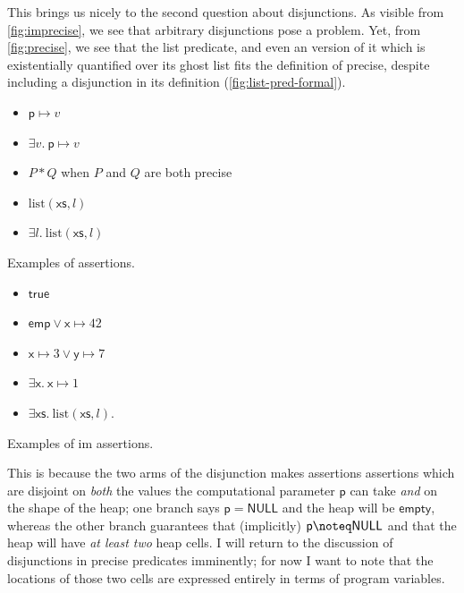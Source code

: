 This brings us nicely to the second question about disjunctions. As visible
from \cref{fig:imprecise}, we see that arbitrary disjunctions pose a problem.
Yet, from \cref{fig:precise}, we see that the list predicate, and even an
version of it which is existentially quantified over its ghost list fits the
definition of precise, despite including a disjunction in its definition
(\cref{fig:list-pred-formal}).

\begin{marginfigure}
\begin{itemize}
    \item $\mathsf{p} \mapsto{} v$
    \item $\exists v.\ \mathsf{p} \mapsto{} v$
    \item $P \ast{} Q$ when $P$ and $Q$ are both precise
    \item $\mathrm{list}(\mathsf{xs}, l)$
    \item $\exists l.\ \mathrm{list}(\mathsf{xs}, l)$
\end{itemize}
\caption{Examples of  assertions.}\label{fig:precise}
\end{marginfigure}

\begin{marginfigure}
\begin{itemize}
    \item $\mathsf{true}$
    \item $\mathsf{emp} \vee{} \mathsf{x} \mapsto{} 42$
    \item $\mathsf{x} \mapsto{} 3 \vee{} \mathsf{y} \mapsto{} 7$
    \item $\exists \mathsf{x}.\ \mathsf{x} \mapsto{} 1$
    \item $\exists \mathsf{xs}.\ \mathrm{list}(\mathsf{xs}, l)$.
\end{itemize}
\caption{Examples of im assertions.}\label{fig:imprecise}
\end{marginfigure}

This is because the two arms of the disjunction makes assertions assertions
which are disjoint on \emph{both} the values the computational parameter
$\mathsf{p}$ can take \emph{and} on the shape of the heap; one branch says
$\mathsf{p} = \mathsf{NULL}$ and the heap will be $\mathsf{empty}$, whereas the
other branch guarantees that (implicitly) $\mathsf{p} \noteq \mathsf{NULL}$ and
that the heap will have \emph{at least two} heap cells. I will return to the
discussion of disjunctions in precise predicates imminently; for now I want to
note that the locations of those two cells are expressed entirely in terms of
program variables.

